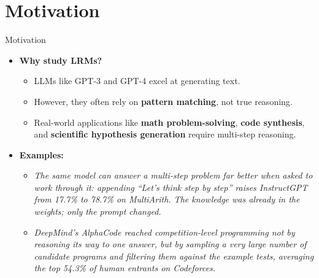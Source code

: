 \section{Motivation}
\begin{frame}[allowframebreaks]{Motivation}
    \begin{itemize}
        \item \textbf{Why study LRMs?}
        \begin{itemize}
            \item LLMs like GPT-3 and GPT-4 excel at generating text.
            \item However, they often rely on \textbf{pattern matching}, not true reasoning.
            \item Real-world applications like \textbf{math problem-solving}, \textbf{code synthesis}, and \textbf{scientific hypothesis generation} require multi-step reasoning.
        \end{itemize}
        \item \textbf{Examples:}
        \begin{itemize}
            \item \textit{The same model can answer a multi-step problem far better when asked to work through it: appending ``Let's think step by step'' raises InstructGPT from 17.7\% to 78.7\% on MultiArith. The knowledge was already in the weights; only the prompt changed.}
            \item \textit{DeepMind's AlphaCode reached competition-level programming not by reasoning its way to one answer, but by sampling a very large number of candidate programs and filtering them against the example tests, averaging the top 54.3\% of human entrants on Codeforces.}
        \end{itemize}
    \end{itemize}
\end{frame}
